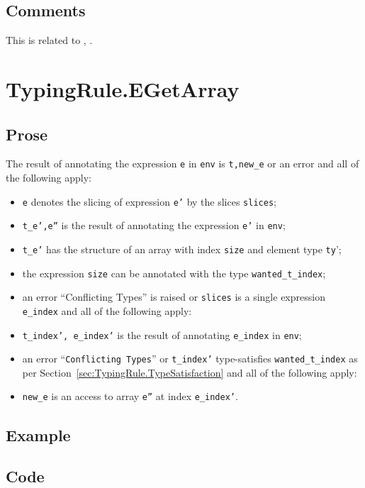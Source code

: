\documentclass{book}
\begin{document}
\subsection{Comments}
  This is related to , .

\section{TypingRule.EGetArray \label{sec:TypingRule.EGetArray}}

  \subsection{Prose}
  The result of annotating the expression \texttt{e} in \texttt{env} is
\texttt{t,new\_e} or an error and all of the following apply:
  \begin{itemize}
  \item \texttt{e} denotes the slicing of expression \texttt{e'} by the slices \texttt{slices};
  \item \texttt{t\_e',e''} is the result of annotating the expression \texttt{e'} in \texttt{env};
  \item \texttt{t\_e'} has the structure of an array with index \texttt{size} and element type \texttt{ty}';
  \item the expression \texttt{size} can be annotated with the type \texttt{wanted\_t\_index};
  \item an error ``Conflicting Types'' is raised or \texttt{slices} is a single expression \texttt{e\_index} and all of the following apply:
  \item \texttt{t\_index', e\_index'} is the result of annotating \texttt{e\_index} in \texttt{env};
  \item an error ``\texttt{Conflicting Types}'' or \texttt{t\_index'} type-satisfies \texttt{wanted\_t\_index} as per Section~\ref{sec:TypingRule.TypeSatisfaction} and all of the following apply:
  \item \texttt{new\_e} is an access to array \texttt{e''} at index \texttt{e\_index'}.
  \end{itemize}

  \subsection{Example}

  \subsection{Code}
\end{document}
